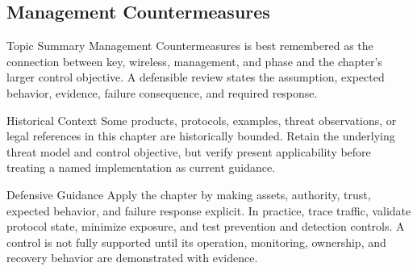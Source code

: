 \documentclass[11pt,letterpaper]{article}
\begin{document}
\subsection*{Management Countermeasures}
\begin{CornellNotesTable}
\end{CornellNotesTable}
\begin{CornellSummaryBox}{Topic Summary}
Management Countermeasures is best remembered as the connection between key, wireless, management, and phase and the chapter's larger control objective. A defensible review states the assumption, expected behavior, evidence, failure consequence, and required response.
\end{CornellSummaryBox}
\begin{CornellWarningBox}{Historical Context}
Some products, protocols, examples, threat observations, or legal references in this chapter are historically bounded. Retain the underlying threat model and control objective, but verify present applicability before treating a named implementation as current guidance.
\end{CornellWarningBox}
\begin{CornellOverviewBox}{Defensive Guidance}
Apply the chapter by making assets, authority, trust, expected behavior, and failure response explicit. In practice, trace traffic, validate protocol state, minimize exposure, and test prevention and detection controls. A control is not fully supported until its operation, monitoring, ownership, and recovery behavior are demonstrated with evidence.
\end{CornellOverviewBox}
\end{document}
